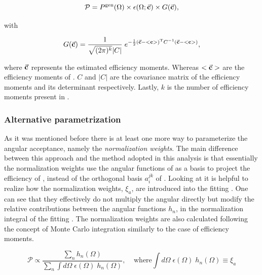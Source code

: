 \begin{equation}
  \centering
  \mathcal{P}= \Pgen \times\epsilon(\Omega;\vec{\bf c})  \times G(\vec{\bf{c}}),
  \label{mvm_constr}
\end{equation}

\noindent with

\begin{equation}
\centering
  G(\vec{\bf{c}}) = \frac{1}{\sqrt{(2\pi)^k}|C|} \; e^{-\frac{1}{2}(  \vec{\bf{c}} - <{\bf{c}}>  )^{\text{T}} C^{-1} (\vec{\bf{c}} - <{\bf{c}}> ) },
\label{mvm_constr_gauss}
\end{equation}

\noindent where $\vec{\bf c}$ represents the estimated efficiency moments. Whereas $<\vec{\bf c}>$ are the efficiency moments
of . $C$ and $|C|$ are the covariance matrix of the efficiency moments and its determinant respectively.
Lastly, $k$ is the number of efficiency moments present in .

\subsubsection{Alternative parametrization}
As it was mentioned before there is at least one more way to parameterize the angular acceptance, namely the \emph{normalization weights}.
The main difference between this approach and the method adopted in this analysis is that essentially the normalization weights use the angular functions
of  as a basis to project the efficiency of , instead of the orthogonal basis $a_i^{jk}$ of .
Looking at  it is helpful to realize how the normalization weights, $\xi_a$, are introduced into the fitting \pdf.
One can see that they effectively do not multiply the angular \pdf directly but modify the relative contributions between the angular functions
$h_n$, in the normalization integral of the fitting \pdf. The normalization weights are also calculated following the concept of Monte Carlo integration
similarly to the case of efficiency moments.

\begin{equation}
  \mathcal{P} \propto \frac{\sum_n h_n(\Omega)}{\sum_n \int d\Omega \; \epsilon(\Omega) \; h_n(\Omega)}, \;\;\;\;\text{where} \int d\Omega \; \epsilon(\Omega) \; h_n(\Omega) \equiv \xi_a
  \label{norm_weights_pdf}
\end{equation}

